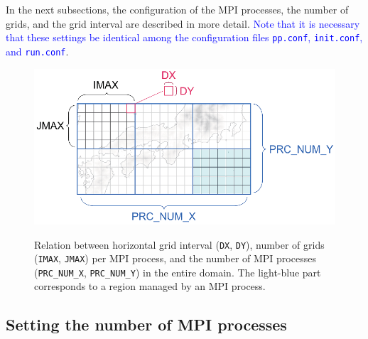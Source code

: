 In the next subsections, the configuration of the MPI processes, the number of grids, and the grid interval are described in more detail.  \textcolor{blue}{Note that it is necessary that these settings  be identical among the configuration files \texttt{pp.conf},  \texttt{init.conf}, and \texttt{run.conf}}.

\begin{figure}[h]
\begin{center}
  \includegraphics[width=0.8\hsize]{./figure/domain_decomposition.eps}\\
  \caption{Relation between horizontal grid interval (\texttt{DX}, \texttt{DY}), number of grids (\texttt{IMAX}, \texttt{JMAX})
    per MPI process, and the number of MPI processes (\texttt{PRC\_NUM\_X}, \texttt{PRC\_NUM\_Y})     in the entire domain. The light-blue part corresponds to a region managed by an MPI process.}
  \label{fig:domain}
\end{center}
\end{figure}

\subsection{Setting the number of MPI processes} \label{subsec:relation_dom_reso2}


